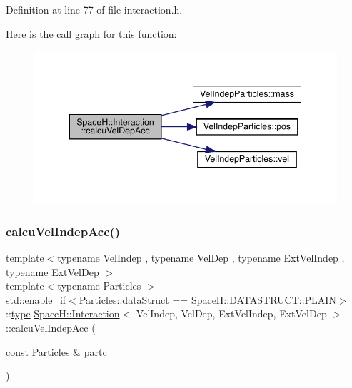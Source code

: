 Definition at line 77 of file interaction.\+h.

Here is the call graph for this function\+:\nopagebreak
\begin{figure}[H]
\begin{center}
\leavevmode
\includegraphics[width=343pt]{class_space_h_1_1_interaction_a738430ac153d28064f0068c338cf061f_cgraph}
\end{center}
\end{figure}
\mbox{\label{class_space_h_1_1_interaction_a89ebbf351411c3b9526c9890e4ff823c}} 
\subsubsection{\texorpdfstring{calcu\+Vel\+Indep\+Acc()}{calcuVelIndepAcc()}\hspace{0.1cm}{\footnotesize\ttfamily [1/2]}}
{\footnotesize\ttfamily template$<$typename Vel\+Indep , typename Vel\+Dep , typename Ext\+Vel\+Indep , typename Ext\+Vel\+Dep $>$ \\
template$<$typename Particles $>$ \\
std\+::enable\+\_\+if$<$\mbox{\hyperlink{class_vel_indep_particles_a6d357b21c216a2b079b1927c18de0b8f}{Particles\+::data\+Struct}} == \mbox{\hyperlink{namespace_space_h_a0af19f79a6498e99dbda772053d44a72af62eb0bf5e5c72e80983fbbac1cb70e5}{Space\+H\+::\+D\+A\+T\+A\+S\+T\+R\+U\+C\+T\+::\+P\+L\+A\+IN}}$>$\+::\mbox{\hyperlink{class_space_h_1_1_interaction_a0bed18b8b8efcb42be264a255f931be6}{type}} \mbox{\hyperlink{class_space_h_1_1_interaction}{Space\+H\+::\+Interaction}}$<$ Vel\+Indep, Vel\+Dep, Ext\+Vel\+Indep, Ext\+Vel\+Dep $>$\+::calcu\+Vel\+Indep\+Acc (\begin{DoxyParamCaption}\item[{const \mbox{\hyperlink{struct_particles}{Particles}} \&}]{partc }\end{DoxyParamCaption})\hspace{0.3cm}{\ttfamily [inline]}}



